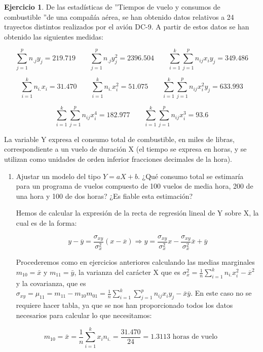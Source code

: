 \documentclass[a4paper, 12pt]{article}
\theoremstyle{definition}
\newtheorem{ej}{Ejercicio}
\begin{document}
\begin{ej}
De las estadísticas de ”Tiempos de vuelo y consumos de combustible ”de una compañía aérea, se
han obtenido datos relativos a 24 trayectos distintos realizados por el avión DC-9. A partir de
estos datos se han obtenido las siguientes medidas:

\[
    \sum_{j=1}^{p}n_{.j}y_j = 219.719 \qquad \sum_{j=1}^{p}n_{.j}y_{j}^{2} = 2396.504 \qquad \sum_{i=1}^{k}\sum_{j=1}^{p}n_{ij}x_i y_j = 349.486
\]

\[
    \sum_{i=1}^{k}n_{i.}x_i = 31.470 \qquad \sum_{i=1}^{k}n_{i.}x_{i}^{2} = 51.075 \qquad \sum_{i=1}^{k}\sum_{j=1}^{p}n_{ij}x_{i}^{2} y_j = 633.993
\]

\[
    \sum_{i=1}^{k}\sum_{j=1}^{p}n_{ij}x_{i}^{4} = 182.977 \qquad \sum_{i=1}^{k}\sum_{j=1}^{p}n_{ij}x_{i}^{3} = 93.6
\]

La variable Y expresa el consumo total de combustible, en miles de libras, correspondiente a
un vuelo de duración X (el tiempo se expresa en horas, y se utilizan como unidades de orden
inferior fracciones decimales de la hora).

\begin{enumerate}[label=\alph*)]
\item Ajustar un modelo del tipo $Y = aX +b$. ¿Qué consumo total se estimaría para un programa
de vuelos compuesto de 100 vuelos de media hora, 200 de una hora y 100 de dos horas? ¿Es
fiable esta estimación?

\newpage

Hemos de calcular la expresión de la recta de regresión lineal de Y sobre X, la cual es de la forma:

\[
    y - \overline{y}  =\frac{\sigma_{xy}}{\sigma_x^2} (x - \overline{x}) \Rightarrow y = \frac{\sigma_{xy}}{\sigma_x^2}x - \frac{\sigma_{xy}}{\sigma_x^2} \overline{x} + \overline{y}
\]

Procederemos como en ejercicios anteriores calculando las medias marginales $m_{10} = \bar{x}$ y $m_{11} = \bar{y}$, la varianza del carácter X que es $\sigma_{x}^{2} = \frac{1}{n} \sum_{i=1}^{k} n_{i.} x_i^2 - \overline{x}^{2}$ y la covarianza, que es $\sigma_{xy} = \mu_{11} = m_{11} - m_{10}m_{01} = \frac{1}{n}\sum_{i=1}^{k}\sum_{j=1}^{p}n_{ij}x_i y_j - \bar{x}\bar{y}$. En este caso no se requiere hacer tabla, ya que se nos han proporcionado todos los datos necesarios para calcular lo que necesitamos:

\[
    m_{10} = \bar{x} = \frac{1}{n} \sum_{i=1}^{k} x_i n_{i.} = \frac{31.470}{24} = 1.3113 \text{ horas de vuelo} \qquad
\]


\end{enumerate}
\end{ej}
\end{document}
